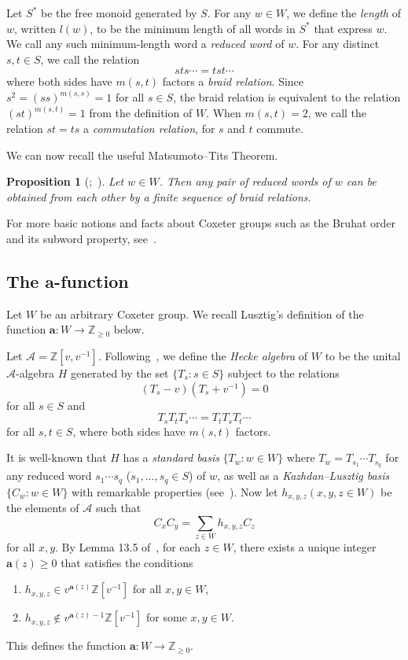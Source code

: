 \documentclass[10pt]{article}
\newtheorem{prop}[theorem]{Proposition}
\theoremstyle{definition}
\newcommand{\Z}{\mathbb{Z}}
\newcommand{\cala}{\mathcal{A}}
\newcommand{\la}{\mathbf{a}}
\newcommand{\ra}{\rightarrow}
\newcommand{\inverse}{^{-1}}
\begin{document}
Let $S^*$ be the free monoid generated by $S$. For any $w\in W$, we define the
\emph{length} of $w$, written $l(w)$, to be the minimum length of all words in
$S^*$ that express $w$. We call any such minimum-length word a \emph{reduced word} of
$w$. For any distinct $s,t\in S$, we call the relation
\[
 sts\cdots=tst\cdots 
\] 
where both sides have $m(s,t)$ factors a \emph{braid relation}. Since
$s^2=(ss)^{m(s,s)}=1$ for all $s\in S$, the
braid relation is equivalent to
the relation $(st)^{m(s,t)}=1$ from the definition of $W$. When $m(s,t)=2$, we call the relation $st=ts$ a \emph{commutation
relation}, for $s$ and $t$ commute. 

We can now recall the useful Matsumoto--Tits Theorem.
\begin{prop}[\cite{Tits};~{\cite[Theorem 1.9]{LG}}]
 \label{Matsumoto-Tits}
 Let $w\in W$. Then any pair of reduced words of $w$ can be obtained from each
 other by a finite sequence of braid relations.
\end{prop}


For more basic notions and facts about Coxeter groups such as 
the Bruhat order and its subword property, see~\cite{BB}.

\subsection{The \texorpdfstring{$\mathbf{a}$}{a}-function}
Let $W$ be an arbitrary Coxeter group. We recall Lusztig's definition of the function
$\la: W\ra \Z_{\ge 0}$ below.

Let $\cala=\Z[v,v\inverse]$. Following~\cite{LG}, we define the \emph{Hecke
algebra} of $W$ to be the unital $\cala$-algebra $H$ generated by the set
$\{T_s:s\in S\}$ subject to the relations 
\begin{equation}
 (T_s-v)(T_s+v\inverse)=0
 \label{eq:our normalization}
\end{equation}
for all $s\in S$ and 
\[
 T_sT_tT_s\cdots = T_tT_sT_t\cdots
\]
for all $s,t\in S$, where both sides have $m(s,t)$ factors.

It is well-known
that $H$ has a \emph{standard basis} $\{T_w:w\in W\}$ where
$T_w=T_{s_1}\cdots T_{s_q}$ for any reduced word $s_1\cdots s_q$ ($s_1,\ldots,
s_q\in S$) of $w$, as well as a \emph{Kazhdan--Lusztig basis} $\{C_w:w\in W\}$
with remarkable properties (see~\cite{EW}). Now let $h_{x,y,z} (x,y,z\in W)$ be the elements of $\cala$
such that
\[
 C_xC_y=\sum_{z\in W} h_{x,y,z}C_z
\]
for all $x,y$. By Lemma 13.5 of~\cite{LG}, for each $z\in W$, there exists a
unique integer $\la(z)\ge 0$ that satisfies the conditions
\begin{enumerate}
 \item $h_{x,y,z}\in v^{\la(z)}\Z[v\inverse]$ for all $x,y\in W$,
 \item $h_{x,y,z}\not\in v^{\la(z)-1}\Z[v\inverse]$ for some $x,y\in W$.
\end{enumerate}
This defines the function $\la: W\ra\Z_{\ge 0}$.
\end{document}
